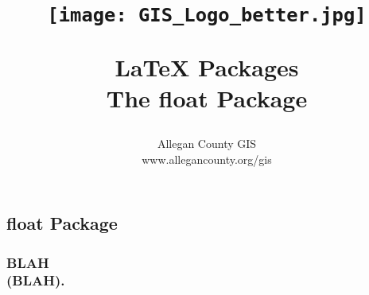 \documentclass[class=book , crop=false]{standalone}
\title{ %
\HRule %
\\[.4cm] %
\begin{figure}[H] %
\begin{center}	%
\texttt{[image: GIS\_Logo\_better.jpg]}
\end{center}
\end{figure}
\Huge \bfseries \LaTeX{} Packages\\ \medskip\large The float Package %
\HRule \\[.4cm] %
}  %
\author{\Large Allegan County GIS \\\Large www.allegancounty.org/gis} %
\begin{document}

\ifstandalone
\maketitle %
\tableofcontents %
\clearpage
\fi

\subsection{float Package}
\medskip 
\subsubsection{\Large BLAH \\\small(BLAH).}
\end{document}

